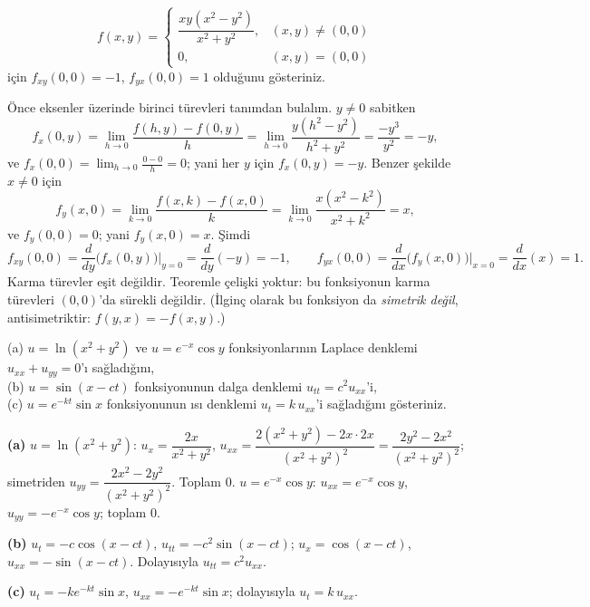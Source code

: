 \begin{soru}
\[
f(x,y)=\begin{cases}\dfrac{xy(x^2-y^2)}{x^2+y^2}, & (x,y)\ne(0,0)\\[4pt] 0, & (x,y)=(0,0)\end{cases}
\]
için $f_{xy}(0,0)=-1$, $f_{yx}(0,0)=1$ olduğunu gösteriniz.
\end{soru}
\begin{cevap}
Önce eksenler üzerinde birinci türevleri tanımdan bulalım. $y\ne0$ sabitken
\[
f_x(0,y)=\lim_{h\to0}\frac{f(h,y)-f(0,y)}{h}=\lim_{h\to0}\frac{y(h^2-y^2)}{h^2+y^2}=\frac{-y^3}{y^2}=-y ,
\]
ve $f_x(0,0)=\lim_{h\to0}\frac{0-0}{h}=0$; yani her $y$ için $f_x(0,y)=-y$. Benzer şekilde $x\ne0$ için
\[
f_y(x,0)=\lim_{k\to0}\frac{f(x,k)-f(x,0)}{k}=\lim_{k\to0}\frac{x(x^2-k^2)}{x^2+k^2}=x ,
\]
ve $f_y(0,0)=0$; yani $f_y(x,0)=x$. Şimdi
\[
f_{xy}(0,0)=\frac{d}{dy}\big(f_x(0,y)\big)\Big|_{y=0}=\frac{d}{dy}(-y)=-1,\qquad
f_{yx}(0,0)=\frac{d}{dx}\big(f_y(x,0)\big)\Big|_{x=0}=\frac{d}{dx}(x)=1 .
\]
Karma türevler eşit değildir. Teoremle çelişki yoktur: bu fonksiyonun karma türevleri $(0,0)$'da sürekli değildir.
(İlginç olarak bu fonksiyon da \emph{simetrik değil}, antisimetriktir: $f(y,x)=-f(x,y)$.)
\end{cevap}

\begin{soru}
(a) $u=\ln(x^2+y^2)$ ve $u=e^{-x}\cos y$ fonksiyonlarının Laplace denklemi $u_{xx}+u_{yy}=0$'ı sağladığını,\\
(b) $u=\sin(x-ct)$ fonksiyonunun dalga denklemi $u_{tt}=c^2u_{xx}$'i,\\
(c) $u=e^{-kt}\sin x$ fonksiyonunun ısı denklemi $u_t=k\,u_{xx}$'i sağladığını gösteriniz.
\end{soru}
\begin{cevap}
\textbf{(a)} $u=\ln(x^2+y^2)$: $u_x=\dfrac{2x}{x^2+y^2}$,
$u_{xx}=\dfrac{2(x^2+y^2)-2x\cdot2x}{(x^2+y^2)^2}=\dfrac{2y^2-2x^2}{(x^2+y^2)^2}$; simetriden
$u_{yy}=\dfrac{2x^2-2y^2}{(x^2+y^2)^2}$. Toplam $0$. \quad
$u=e^{-x}\cos y$: $u_{xx}=e^{-x}\cos y$, $u_{yy}=-e^{-x}\cos y$; toplam $0$.

\textbf{(b)} $u_t=-c\cos(x-ct)$, $u_{tt}=-c^2\sin(x-ct)$; $u_x=\cos(x-ct)$, $u_{xx}=-\sin(x-ct)$. Dolayısıyla
$u_{tt}=c^2u_{xx}$.

\textbf{(c)} $u_t=-k e^{-kt}\sin x$, $u_{xx}=-e^{-kt}\sin x$; dolayısıyla $u_t=k\,u_{xx}$.
\end{cevap}

